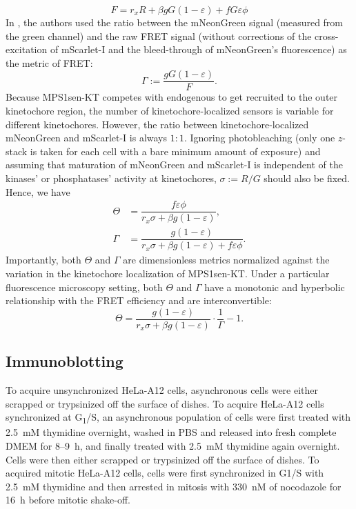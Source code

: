 \begin{equation*}
    F = r_xR + \beta gG(1 - \varepsilon) + fG\varepsilon\phi
\end{equation*}
In \cite{MPS1senor}, the authors used the ratio between the mNeonGreen signal (measured from the green channel) and the raw FRET signal (without corrections of the cross-excitation of mScarlet-I and the bleed-through of mNeonGreen's fluorescence) as the metric of FRET:
\begin{equation*}
    \Gamma := \dfrac{gG(1 - \varepsilon)}{F}.
\end{equation*}
Because MPS1sen-KT competes with endogenous  to get recruited to the outer kinetochore region, the number of kinetochore-localized sensors is variable for different kinetochores. However, the ratio between kinetochore-localized mNeonGreen and mScarlet-I is always $1 : 1$. Ignoring photobleaching (only one $z$-stack is taken for each cell with a bare minimum amount of exposure) and assuming that maturation of mNeonGreen and mScarlet-I is independent of the kinases' or phosphatases' activity at kinetochores, $\sigma := R/G$ should also be fixed. Hence, we have
\begin{align*}
    \Theta &= \dfrac{f\varepsilon\phi}{r_x\sigma + \beta g(1 - \varepsilon)},\\
    \Gamma &= \dfrac{g(1 - \varepsilon)}{r_x\sigma + \beta g(1 - \varepsilon) + f\varepsilon\phi}.
\end{align*}
Importantly, both $\Theta$ and $\Gamma$ are dimensionless metrics normalized against the variation in the kinetochore localization of MPS1sen-KT. Under a particular fluorescence microscopy setting, both $\Theta$ and $\Gamma$ have a monotonic and hyperbolic relationship with the FRET efficiency and are interconvertible:
\begin{equation*}
    \Theta = \dfrac{g(1 - \varepsilon)}{r_x\sigma + \beta g(1 - \varepsilon)}\cdot\dfrac{1}{\Gamma} - 1.
\end{equation*}

\subsection{Immunoblotting}
\label{WBMethods}
To acquire unsynchronized HeLa-A12 cells, asynchronous cells were either scrapped or trypsinized off the surface of dishes. To acquire HeLa-A12 cells synchronized at G\textsubscript{1}/S, an asynchronous population of cells were first treated with \SI{2.5}{mM} thymidine overnight, washed in PBS and released into fresh complete DMEM for 8--\SI{9}{h}, and finally treated with \SI{2.5}{mM} thymidine again overnight. Cells were then either scrapped or trypsinized off the surface of dishes. To acquired mitotic HeLa-A12 cells, cells were first synchronized in G1/S with \SI{2.5}{mM} thymidine and then arrested in mitosis with \SI{330}{nM} of nocodazole for \SI{16}{h} before mitotic shake-off.

